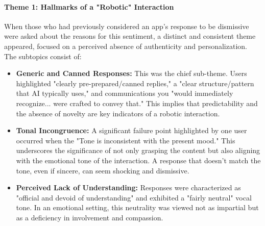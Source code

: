 \documentclass[conference]{IEEEtran}
\begin{document}
	\paragraph{Theme 1: Hallmarks of a "Robotic" Interaction}
	When those who had previously considered an app's response to be dismissive were asked about the reasons for this sentiment, a distinct and consistent theme appeared, focused on a perceived absence of authenticity and personalization. The subtopics consist of:
	\begin{itemize}
		\item \textbf{Generic and Canned Responses:} This was the chief sub-theme. Users highlighted "clearly pre-prepared/canned replies," a "clear structure/pattern that AI typically uses," and communications you "would immediately recognize... were crafted to convey that." This implies that predictability and the absence of novelty are key indicators of a robotic interaction.
		\item \textbf{Tonal Incongruence:} A significant failure point highlighted by one user occurred when the "Tone is inconsistent with the present mood." This underscores the significance of not only grasping the content but also aligning with the emotional tone of the interaction. A response that doesn’t match the tone, even if sincere, can seem shocking and dismissive.
		\item \textbf{Perceived Lack of Understanding:} Responses were characterized as "official and devoid of understanding" and exhibited a "fairly neutral" vocal tone. In an emotional setting, this neutrality was viewed not as impartial but as a deficiency in involvement and compassion.
	\end{itemize}
	
\end{document}
